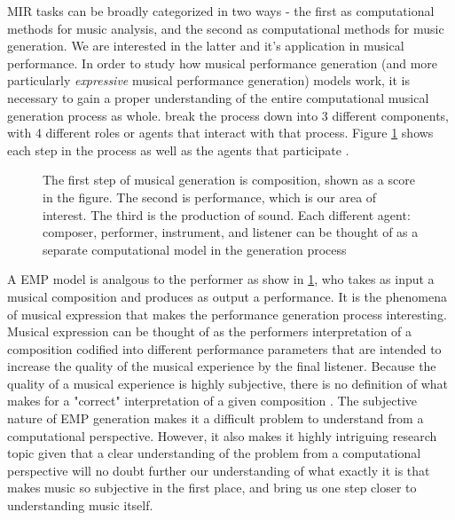 MIR tasks can be broadly categorized in two ways - the first as computational methods for music analysis, and the second as computational methods for music generation. We are interested in the latter and it's application in musical performance. In order to study how musical performance generation (and more particularly \emph{expressive} musical performance generation) models work, it is necessary to gain a proper understanding of the entire computational musical generation process as whole. \citet{ji2020comprehensive} break the process down into 3 different components, with 4 different roles or agents that interact with that process. Figure \ref{fig:generation_process} shows each step in the process as well as the agents that participate . 

\begin{figure}
    \centering
    \caption{The first step of musical generation is composition, shown as a score in the figure. The second is performance, which is our area of interest. The third is the production of sound. Each different agent: composer, performer, instrument, and listener can be thought of as a separate computational model in the generation process}
    \label{fig:generation_process}
\end{figure}

A EMP model is analgous to the performer as show in \ref{fig:generation_process}, who takes as input a musical composition and produces as output a performance. It is the phenomena of musical expression that makes the performance generation process interesting. Musical expression can be thought of as the performers interpretation of a composition codified into different performance parameters that are intended to increase the quality of the musical experience by the final listener. Because the quality of a musical experience is highly subjective, there is no definition of what makes for a "correct" interpretation of a given composition \cite{cancino2018computational}. The subjective nature of EMP generation makes it a difficult problem to understand from a computational perspective. However, it also makes it highly intriguing research topic given that a clear understanding of the problem from a computational perspective will no doubt further our understanding of what exactly it is that makes music so subjective in the first place, and bring us one step closer to understanding music itself. 

